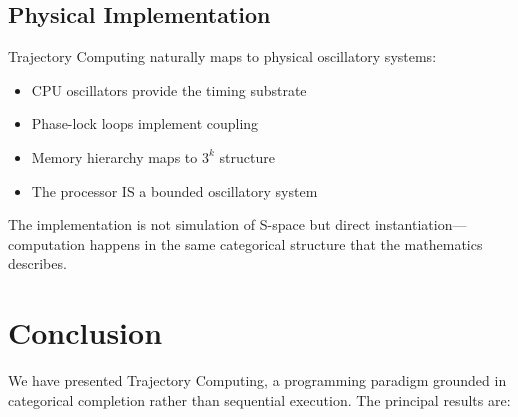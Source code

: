 \documentclass[twocolumn,10pt]{article}
\theoremstyle{remark}
\begin{document}
\subsection{Physical Implementation}

Trajectory Computing naturally maps to physical oscillatory systems:

\begin{itemize}
    \item CPU oscillators provide the timing substrate
    \item Phase-lock loops implement coupling
    \item Memory hierarchy maps to $3^k$ structure
    \item The processor IS a bounded oscillatory system
\end{itemize}

The implementation is not simulation of S-space but direct instantiation---computation happens in the same categorical structure that the mathematics describes.

\section{Conclusion}
\label{sec:conclusion}

We have presented Trajectory Computing, a programming paradigm grounded in categorical completion rather than sequential execution. The principal results are:
\end{document}
